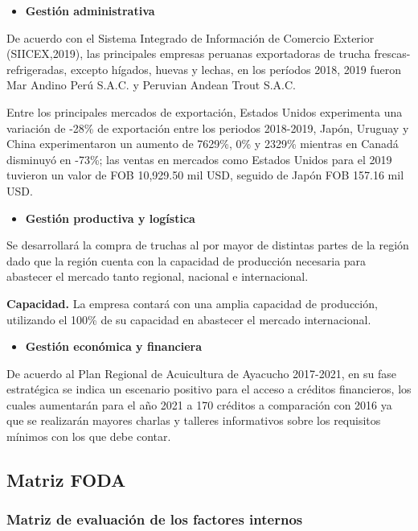 \documentclass[
  stu,
  floatsintext,
  longtable,
  a4paper,
  nolmodern,
  notxfonts,
  notimes,
  colorlinks=true,linkcolor=blue,citecolor=blue,urlcolor=blue]{apa7}
\providecommand{\tightlist}{%
  \setlength{\itemsep}{0pt}\setlength{\parskip}{0pt}}
\begin{document}
\begin{itemize}
\tightlist
\item
  \textbf{Gestión administrativa}
\end{itemize}

De acuerdo con el Sistema Integrado de Información de Comercio Exterior
(SIICEX,2019), las principales empresas peruanas exportadoras de trucha
frescas-refrigeradas, excepto hígados, huevas y lechas, en los períodos
2018, 2019 fueron Mar Andino Perú S.A.C. y Peruvian Andean Trout S.A.C.

Entre los principales mercados de exportación, Estados Unidos
experimenta una variación de -28\% de exportación entre los periodos
2018-2019, Japón, Uruguay y China experimentaron un aumento de 7629\%,
0\% y 2329\% mientras en Canadá disminuyó en -73\%; las ventas en
mercados como Estados Unidos para el 2019 tuvieron un valor de FOB
10,929.50 mil USD, seguido de Japón FOB 157.16 mil USD.

\begin{itemize}
\tightlist
\item
  \textbf{Gestión productiva y logística}
\end{itemize}

Se desarrollará la compra de truchas al por mayor de distintas partes de
la región dado que la región cuenta con la capacidad de producción
necesaria para abastecer el mercado tanto regional, nacional e
internacional.

\textbf{Capacidad.} La empresa contará con una amplia capacidad de
producción, utilizando el 100\% de su capacidad en abastecer el mercado
internacional.

\begin{itemize}
\tightlist
\item
  \textbf{Gestión económica y financiera}
\end{itemize}

De acuerdo al Plan Regional de Acuicultura de Ayacucho 2017-2021, en su
fase estratégica se indica un escenario positivo para el acceso a
créditos financieros, los cuales aumentarán para el año 2021 a 170
créditos a comparación con 2016 ya que se realizarán mayores charlas y
talleres informativos sobre los requisitos mínimos con los que debe
contar.

\subsection{Matriz FODA}\label{matriz-foda}

\subsubsection{Matriz de evaluación de los factores
internos}\label{matriz-de-evaluaciuxf3n-de-los-factores-internos}
\end{document}
